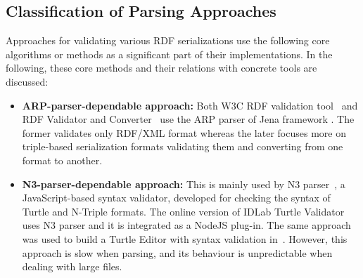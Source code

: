 \subsection{Classification of Parsing Approaches}

Approaches for validating various RDF serializations use the following core algorithms or methods as a significant part of their implementations. 
In the following, these core methods and their relations with concrete tools are discussed: 

\begin{itemize}[noitemsep] 

\item \textbf{ARP-parser-dependable approach:} Both W3C RDF validation tool~\cite{W3C:Validation:Online} and RDF Validator and Converter~\cite{Mybluemix:Validation:Online} use the ARP parser of Jena framework \cite{McBride:2002:JSW:613357.613755}. 
The former validates only RDF/XML format whereas the later focuses more on triple-based serialization formats validating them and converting from one format to another. 

\item \textbf{N3-parser-dependable approach:} This is mainly used by N3 parser~\cite{N3Parser:Online}, a JavaScript-based syntax validator, developed for checking the syntax of Turtle and N-Triple formats. 
The online version of IDLab Turtle Validator \cite{IDLab:Validation:Online} uses N3 parser and it is integrated as a NodeJS plug-in. 
The same approach was used to build a Turtle Editor with syntax validation in~\cite{petersenturtleeditor}. 
However, this approach is slow when parsing, and its behaviour is unpredictable when dealing with large files. 


\end{itemize}
